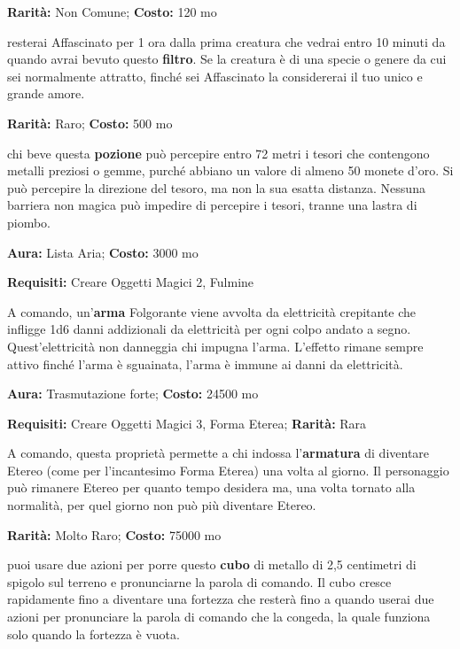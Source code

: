 \begin{multicols}{2}

\textbf{Rarità:} Non Comune; \textbf{Costo:} 120 mo

resterai Affascinato per 1 ora dalla prima creatura che vedrai entro 10 minuti da quando avrai bevuto questo \textbf{filtro}. Se la creatura è di una specie o genere da cui sei normalmente attratto, finché sei Affascinato la considererai il tuo unico e grande amore.


\textbf{Rarità:} Raro; \textbf{Costo:} 500 mo

chi beve questa \textbf{pozione} può percepire entro 72 metri i tesori che contengono metalli preziosi o gemme, purché abbiano un valore di almeno 50 monete d'oro. Si può percepire la direzione del tesoro, ma non la sua esatta distanza. Nessuna barriera non magica può impedire di percepire i tesori, tranne una lastra di piombo.


\textbf{Aura:} Lista Aria; \textbf{Costo:} 3000 mo

\textbf{Requisiti:} Creare Oggetti Magici 2, Fulmine

A comando, un'\textbf{arma} Folgorante viene avvolta da elettricità crepitante che infligge 1d6 danni addizionali da elettricità per ogni colpo andato a segno. Quest'elettricità non danneggia chi impugna l'arma. L'effetto rimane sempre attivo finché l'arma è sguainata, l'arma è immune ai danni da elettricità.


\textbf{Aura:} Trasmutazione forte; \textbf{Costo:} 24500 mo

\textbf{Requisiti:} Creare Oggetti Magici 3, Forma Eterea; \textbf{Rarità:} Rara

A comando, questa proprietà permette a chi indossa l'\textbf{armatura} di diventare Etereo (come per l'incantesimo Forma Eterea) una volta al giorno. Il personaggio può rimanere Etereo per quanto tempo desidera ma, una volta tornato alla normalità, per quel giorno non può più diventare Etereo.


\textbf{Rarità:} Molto Raro; \textbf{Costo:} 75000 mo

puoi usare due azioni per porre questo \textbf{cubo} di metallo di 2,5 centimetri di spigolo sul terreno e pronunciarne la parola di comando. Il cubo cresce rapidamente fino a diventare una fortezza che resterà fino a quando userai due azioni per pronunciare la parola di comando che la congeda, la quale funziona solo quando la fortezza è vuota.


\end{multicols}
